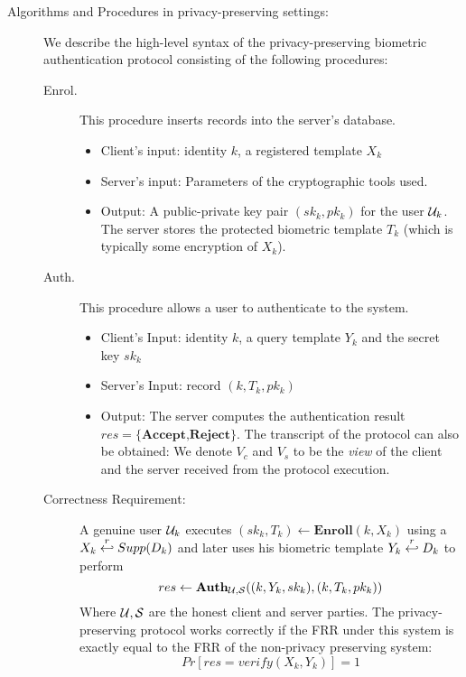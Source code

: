 \begin{description}
\item[Algorithms and Procedures in privacy-preserving settings:] We describe the
  high-level syntax of the privacy-preserving biometric authentication protocol consisting of the following procedures:
  \begin{description}
  \item[Enrol.] This procedure inserts records into the server's database.
    \begin{itemize}
    \item Client's input: identity $k$, a registered template $X_k$
    \item Server's input: Parameters of the cryptographic tools used.
    \item Output: A public-private key pair $(sk_k, pk_k)$ for the user
      $\mathcal{U}_k$. The server stores the protected biometric template $T_k$ (which is typically
      some encryption of $X_k$).
    \end{itemize}
  \item[Auth.] This procedure allows a user to authenticate to the system.
    \begin{itemize}
    \item Client's Input: identity $k$, a query template $Y_k$ and the secret key
      $sk_k$ 
    \item Server's Input: record $(k, T_k, pk_k)$
    \item Output: The server computes the authentication result
      $res=\{\textbf{Accept,Reject}\}$. The transcript of the protocol can also
      be obtained: We denote \(V_{c}\) and \(V_{s}\) to be the \textit{view} of
      the client and the server received from the protocol execution.
    \end{itemize}

  \item[Correctness Requirement:] A genuine user $\mathcal{U}_k$ executes
    $(sk_k, T_k) \gets \mathbf{Enroll}(k, X_k)$ using a $X_k \stackrel{r}{\hookleftarrow} Supp(D_k)$ and
    later uses his biometric template $Y_k \stackrel{r}{\hookleftarrow} D_k$ to perform
    $$res \gets \mathbf{Auth}_{\mathcal{U},\mathcal{S}}( (k, Y_k, sk_k), (k, T_k, pk_k))$$
    Where $\mathcal{U}, \mathcal{S}$ are the honest client and server parties.
    The privacy-preserving protocol works correctly if the FRR under this system
    is exactly equal to the FRR of the non-privacy preserving system:
    \[
      Pr[res = verify(X_k,Y_k)] = 1
    \]
  \end{description}
\end{description}

